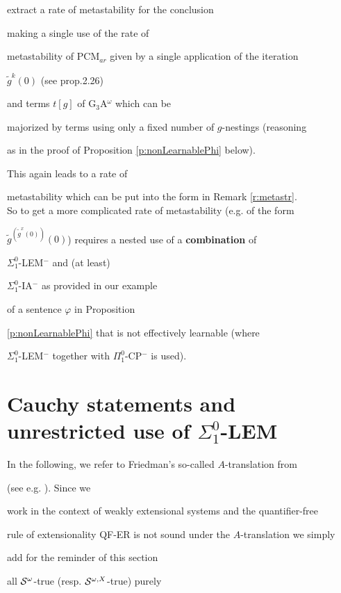 \documentclass[1p]{elsarticle}
\theoremstyle{plain}
\theoremstyle{definition}
\theoremstyle{remark}
\theoremstyle{definition}
\begin{document}
{extract a rate of metastability for the conclusion 

making a single use of the rate of 

metastability of PCM$_{ar}$ given by a single application of the iteration 

$\tilde{g}^{k}(0)$ (see \cite{Kohlenbach(book)} prop.2.26) 

and terms $t[g]$ of G$_3$A$^{\omega}$ which can be 

majorized by terms using only a fixed number of $g$-nestings (reasoning 

as in the proof of Proposition \ref{p:nonLearnablePhi} below). 

This again leads to a rate of 

metastability which can be put into the form in Remark \ref{r:metastr}.\\[1mm] 

So to get a more complicated rate of metastability (e.g. of the form 

$\tilde{g}^{(\tilde{g}^x(0))}(0)$) requires a nested use of a {\bf combination} of 

$\Sigma^0_1$-LEM$^-$ and (at least) 

$\Sigma^0_1$-IA$^-$ as provided in our example 

of a sentence $\varphi$ in Proposition 

\ref{p:nonLearnablePhi} that is not effectively learnable (where 

$\Sigma^0_1$-LEM$^-$ together with $\Pi^0_1$-CP$^-$ is used).

 



\section{Cauchy statements and unrestricted use of $\Sigma^0_1$-LEM}

In the following, we refer to Friedman's so-called $A$-translation from 

\cite{Friedman(78)} (see e.g. \cite{Kohlenbach(book)}). Since we 

work in the context of weakly extensional systems and the quantifier-free 

rule of extensionality QF-ER is not sound under the $A$-translation we simply 

add for the reminder of this section 

all ${\cal S}^{\omega}$-true (resp. ${\cal S}^{\omega,X}$-true) purely 

}
\end{document}
